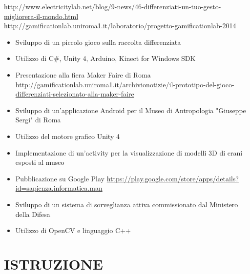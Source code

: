 \documentclass[11pt,a4paper,sans]{moderncv} %
\begin{document}
{
	\url{http://www.electricitylab.net/blog/9-news/46-differenziati-un-tuo-gesto-migliorera-il-mondo.html}
	\newline{}
	\url{http://gamificationlab.uniroma1.it/laboratorio/progetto-gamificationlab-2014}
	\begin{itemize}
		\item Sviluppo di un piccolo gioco sulla raccolta differenziata
		\item Utilizzo di C\#, Unity 4, Arduino, Kinect for Windows SDK
		\item Presentazione alla fiera Maker Faire di Roma
		\newline{} \url{http://gamificationlab.uniroma1.it/archivionotizie/il-prototipo-del-gioco-differenziati-selezionato-alla-maker-faire}
	\end{itemize}
}

{
	\begin{itemize}
		\item Sviluppo di un'applicazione Android per il Museo di Antropologia "Giuseppe Sergi" di Roma
		\item Utilizzo del motore grafico Unity 4
		\item Implementazione di un'activity per la visualizzazione di modelli 3D di crani esposti al museo
		\item Pubblicazione su Google Play
		\newline{}
		\url{https://play.google.com/store/apps/details?id=sapienza.informatica.man}
	\end{itemize}
}

{
	\begin{itemize}
		\item Sviluppo di un sistema di sorveglianza attiva commissionato dal Ministero della Difesa
		\item Utilizzo di OpenCV e linguaggio C++
	\end{itemize}
}


\section{ISTRUZIONE}
{
}
\end{document}
